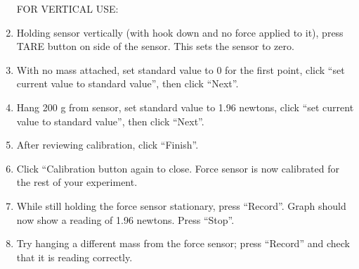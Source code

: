\begin{enumerate}
\vspace{0.1in}
\hspace{-0.2in}FOR VERTICAL USE:

\setcounter{enumi}{5}

\item Holding sensor vertically (with hook down and no force applied to it), press TARE button on side of the sensor. This sets the sensor to zero.

\item With no mass attached, set standard value to 0 for the first point, click ``set current value to standard value'', then click ``Next''.

\item Hang 200 g from sensor, set standard value to 1.96 newtons, click ``set current value to standard value'', then click ``Next''.

\item After reviewing calibration, click ``Finish''.

\item Click ``Calibration button again to close. Force sensor is now calibrated for the rest of your experiment.

\item While still holding the force sensor stationary, press ``Record''. Graph should now show a reading of 1.96 newtons. Press ``Stop''.

\item Try hanging a different mass from the force sensor; press ``Record'' and check that it is reading correctly.
\end{enumerate}
